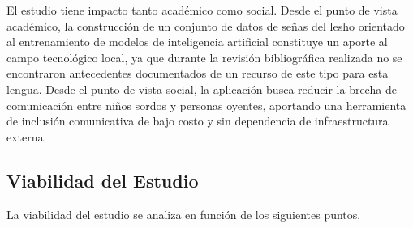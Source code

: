 El estudio tiene impacto tanto académico como social. Desde el punto de vista académico,
la construcción de un conjunto de datos de señas del \acrshort{lesho} orientado al entrenamiento de modelos
de inteligencia artificial constituye un aporte al campo tecnológico local, ya que durante
la revisión bibliográfica realizada no se encontraron antecedentes documentados de un
recurso de este tipo para esta lengua.
Desde el punto de vista social, la aplicación busca reducir la brecha de comunicación entre
niños sordos y personas oyentes, aportando una herramienta de inclusión comunicativa
de bajo costo y sin dependencia de infraestructura externa.

\subsection{Viabilidad del Estudio}

La viabilidad del estudio se analiza en función de los siguientes puntos.

